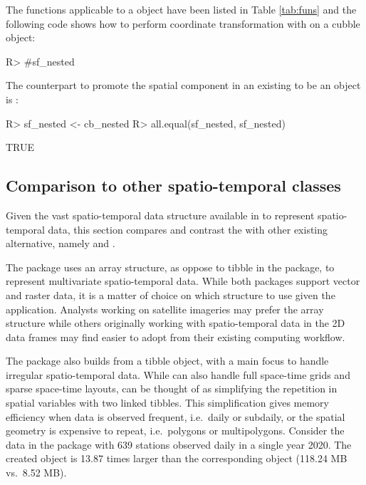 \documentclass[
  shortnames]{jss}
\begin{document}
The  functions applicable to a  object have been listed in Table \ref{tab:funs} and the following code shows how to perform coordinate transformation with  on a cubble object:

\begin{CodeChunk}
\begin{CodeInput}
R> #sf_nested %
\end{CodeInput}
\end{CodeChunk}

The counterpart to promote the spatial component in an existing  to be an  object is :

\begin{CodeChunk}
\begin{CodeInput}
R> sf_nested <- cb_nested %
R> all.equal(sf_nested, sf_nested)
\end{CodeInput}
\begin{CodeOutput}
[1] TRUE
\end{CodeOutput}
\end{CodeChunk}

\hypertarget{tidyverse}{%
\subsection{Comparison to other spatio-temporal classes}\label{tidyverse}}

Given the vast spatio-temporal data structure available in  to represent spatio-temporal data, this section compares and contrast the  with other existing alternative, namely  and .

The  package \citep{stars} uses an array structure, as oppose to tibble in the  package, to represent multivariate spatio-temporal data. While both packages support vector and raster data, it is a matter of choice on which structure to use given the application. Analysts working on satellite imageries may prefer the array structure while others originally working with spatio-temporal data in the 2D data frames may find  easier to adopt from their existing computing workflow.

The  package \citep{sftime} also builds from a tibble object, with a main focus to handle irregular spatio-temporal data. While  can also handle full space-time grids and sparse space-time layouts,  can be thought of as simplifying the repetition in spatial variables with two linked tibbles. This simplification gives memory efficiency when data is observed frequent, i.e.~daily or subdaily, or the spatial geometry is expensive to repeat, i.e.~polygons or multipolygons. Consider the  data in the  package with 639 stations observed daily in a single year 2020. The created  object is 13.87 times larger than the corresponding  object (118.24 MB vs.~8.52 MB).
\end{document}
